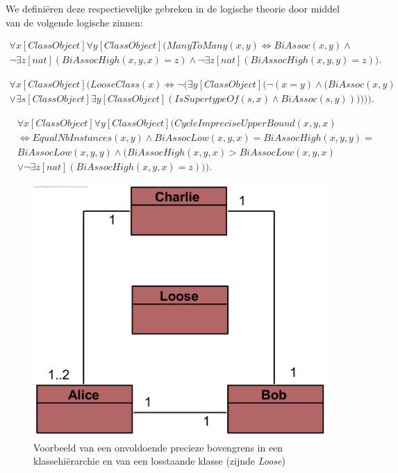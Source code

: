 We defini\"eren deze respectievelijke gebreken in de logische theorie door middel van de volgende logische zinnen:

\begin{align}
\nonumber \forall{x}[ClassObject]\forall{y}[ClassObject](ManyToMany(x,y) \Leftrightarrow BiAssoc(x,y) \land \\ \lnot\exists{z}[nat](BiAssocHigh(x,y,x) = z) \land \lnot\exists{z}[nat](BiAssocHigh(x,y,y) = z)).\label{form:manytomany}
\end{align}

\begin{align}
\nonumber \forall{x}[ClassObject](LooseClass(x) \Leftrightarrow \lnot(\exists{y}[ClassObject](\lnot(x = y) \land (BiAssoc(x,y) \\ \lor \exists{s}[ClassObject]\exists{y}[ClassObject](\mathit{IsSupertypeOf}(s,x) \land BiAssoc(s,y)))))).\label{form:loose}
\end{align}

\begin{align}
&\nonumber\forall{x}[ClassObject]\forall{y}[ClassObject](CycleImpreciseUpperBound(x, y, x) \\ &\nonumber\Leftrightarrow EqualNbInstances(x, y) \land BiAssocLow(x, y, x) = BiAssocHigh(x, y, y) = \\ &\nonumber{}BiAssocLow(x, y, y) \land (BiAssocHigh(x, y, x) > BiAssocLow(x, y, x) \\ &\lor \lnot\exists{z}[nat](BiAssocHigh(x, y, x) = z))).\label{form:imprecise-bound}
\end{align}

\begin{figure}
	\centering
	\includegraphics{chap-kwaliteitsgebrek/cycle.png}
	\caption{Voorbeeld van een onvoldoende precieze bovengrens in een klassehi\"erarchie en van een losstaande klasse (zijnde \textit{Loose})}
	\label{fig:cycle}
\end{figure}

